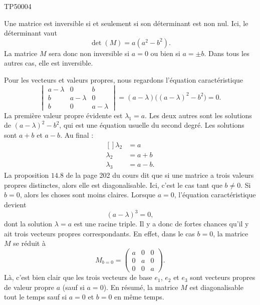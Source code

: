 \begin{corrige}{TP50004}

	Une matrice est inversible si et seulement si son déterminant est non nul. Ici, le déterminant vaut
	\begin{equation}
		\det(M)=a(a^2-b^2).
	\end{equation}
	La matrice $M$ sera donc non inversible si $a=0$ ou bien si $a=\pm b$. Dans tous les autres cas, elle est inversible.

	Pour les vecteurs et valeurs propres, nous regardons l'équation caractéristique
	\begin{equation}
		\begin{vmatrix}
			a-\lambda	&	0	&	b	\\
			b	&	a-\lambda	&	0	\\
			b	&	0	&	a-\lambda
		\end{vmatrix}=
		(a-\lambda)\big( (a-\lambda)^2-b^2 \big)=0.
	\end{equation}
	La première valeur propre évidente est $\lambda_1=a$. Les deux autres sont les solutions de $(a-\lambda)^2-b^2$, qui est une équation usuelle du second degré. Les solutions sont $a+b$ et $a-b$.  Au final :
	\begin{equation}
		\begin{aligned}[]
			\lambda_2&=a\\
			\lambda_2&=a+b\\
			\lambda_3&=a-b.
		\end{aligned}
	\end{equation}
	La proposition $14.8$ de la page 202 du cours dit que si une matrice a trois valeurs propres distinctes, alors elle est diagonalisable. Ici, c'est le cas tant que $b\neq 0$. Si $b=0$, alors les choses sont moins claires. Lorsque $a=0$, l'équation caractéristique devient
	\begin{equation}
		(a-\lambda)^3=0,
	\end{equation}
	dont la solution $\lambda=a$ est une racine triple. Il y a donc de fortes chances qu'il y ait trois vecteurs propres correspondants. En effet, dans le cas $b=0$, la matrice $M$ se réduit à
	\begin{equation}
		M_{b=0}=
		\begin{pmatrix}
			a	&	0	&	0	\\
			0	&	a	&	0	\\
			0	&	0	&	a
		\end{pmatrix}.
	\end{equation}
	Là, c'est bien clair que les trois vecteurs de base $e_1$, $e_2$ et $e_3$ sont vecteurs propres de valeur propre $a$ (sauf si $a=0$). En résumé, la matrice $M$ est diagonalisable tout le temps sauf si $a=0$ et $b=0$ en même temps.


\end{corrige}
